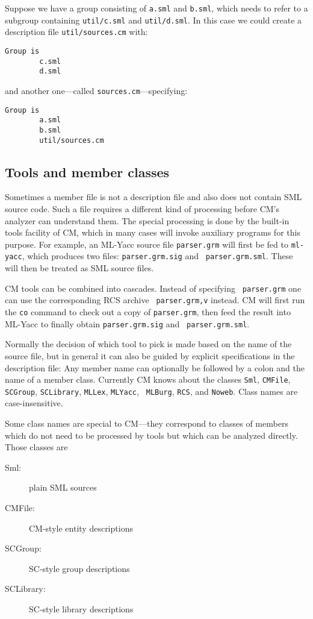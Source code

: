 \documentclass{article}
\begin{document}
Suppose we have a group consisting of {\tt a.sml} and {\tt b.sml},
which needs to refer to a subgroup containing {\tt util/c.sml} and
{\tt util/d.sml}.  In this case we could create a description file
{\tt util/sources.cm} with:

\begin{verbatim}
Group is
        c.sml
        d.sml
\end{verbatim}

and another one---called {\tt sources.cm}---specifying:

\begin{verbatim}
Group is
        a.sml
        b.sml
        util/sources.cm
\end{verbatim}

\subsection{Tools and member classes}

Sometimes a member file is not a description file and also does not
contain SML source code.  Such a file requires a different kind of
processing before CM's analyzer can understand them.  The special
processing is done by the built-in tools facility of CM, which in many
cases will invoke auxiliary programs for this purpose.  For
example, an ML-Yacc source file {\tt parser.grm} will first be fed to
{\tt ml-yacc}, which produces two files: {\tt parser.grm.sig} and {\tt
parser.grm.sml}.  These will then be treated as SML source files.

CM tools can be combined into cascades.  Instead of specifying {\tt
parser.grm} one can use the corresponding RCS archive {\tt
parser.grm,v} instead.  CM will first run the {\tt co} command to
check out a copy of {\tt parser.grm}, then feed the result into
ML-Yacc to finally obtain {\tt parser.grm.sig} and {\tt
parser.grm.sml}.

Normally the decision of which tool to pick is made based on the name
of the source file, but in general it can also be guided by explicit
specifications in the description file: Any member name can  optionally
be followed by a colon and the name of a member class.
Currently CM knows about the classes {\tt Sml}, {\tt CMFile},
{\tt SCGroup}, {\tt SCLibrary}, {\tt MLLex}, {\tt MLYacc}, {\tt
MLBurg}, {\tt RCS}, and {\tt Noweb}. Class names are case-insensitive.

Some class names are special to CM---they correspond to
classes of members which do not need to be processed by tools but
which can be analyzed directly.  Those classes are
{\samepage
\begin{description}
\item[Sml:] plain SML sources
\item[CMFile:] CM-style entity descriptions
\item[SCGroup:] SC-style group descriptions
\item[SCLibrary:] SC-style library descriptions
\end{description}
}
\end{document}
